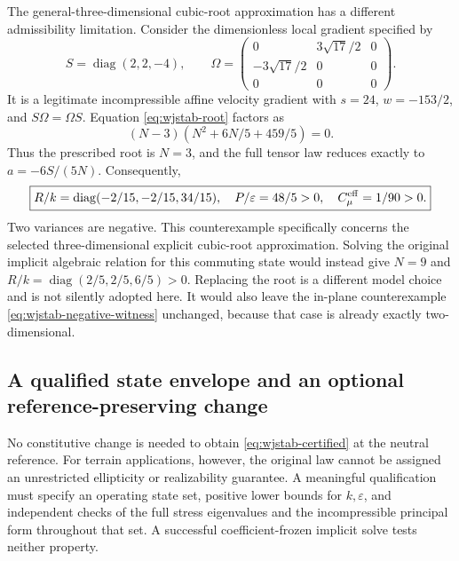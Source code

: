 \documentclass[11pt,a4paper]{article}
\numberwithin{equation}{section}
\begin{document}
The general-three-dimensional cubic-root approximation has a different
admissibility limitation. Consider the dimensionless local gradient
specified by
\begin{equation}
 S=\operatorname{diag}(2,2,-4),\qquad
 \Omega=\begin{pmatrix}0&3\sqrt{17}/2&0\\
                    -3\sqrt{17}/2&0&0\\0&0&0\end{pmatrix}.
 \label{eq:wjstab-psd-counterexample}
\end{equation}
It is a legitimate incompressible affine velocity gradient with
$s=24$, $w=-153/2$, and $S\Omega=\Omega S$. Equation
\eqref{eq:wjstab-root} factors as
\begin{equation}
 (N-3)(N^2+6N/5+459/5)=0.
 \label{eq:wjstab-psd-root}
\end{equation}
Thus the prescribed root is $N=3$, and the full tensor law reduces
exactly to $a=-6S/(5N)$. Consequently,
\begin{equation}
 \boxed{R/k=\operatorname{diag}(-2/15,-2/15,34/15),
 \quad P/\varepsilon=48/5>0,\quad C_\mu^{\rm eff}=1/90>0.}
 \label{eq:wjstab-psd-failure}
\end{equation}
Two variances are negative. This counterexample specifically concerns
the selected three-dimensional explicit cubic-root approximation.
Solving the original implicit algebraic relation for this commuting
state would instead give $N=9$ and
$R/k=\operatorname{diag}(2/5,2/5,6/5)>0$. Replacing the root is a
different model choice and is not silently adopted here. It would also
leave the in-plane counterexample
\eqref{eq:wjstab-negative-witness} unchanged, because that case is
already exactly two-dimensional.

\subsection{A qualified state envelope and an optional reference-preserving change}

No constitutive change is needed to obtain
\eqref{eq:wjstab-certified} at the neutral reference. For terrain
applications, however, the original law cannot be assigned an
unrestricted ellipticity or realizability guarantee. A meaningful
qualification must specify an operating state set, positive lower
bounds for $k,\varepsilon$, and independent checks of the full stress
eigenvalues and the incompressible principal form throughout that set.
A successful coefficient-frozen implicit solve tests neither property.
\end{document}
